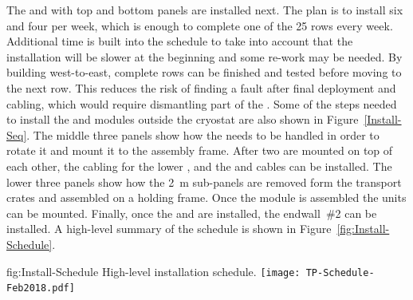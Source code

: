 The  and  with top and bottom  panels are
installed next. The plan is to install six  and four
 per week, which is enough to complete one of the \num{25}
rows every week. Additional time is built into the schedule to take
into account that the installation will be slower at the beginning and
some re-work may be needed. By building west-to-east, complete rows can
be finished and tested before moving to the next row. This reduces the
risk of finding a fault after final  deployment and cabling,
which would require dismantling part of the . Some of the steps
needed to install the  and  modules outside the
cryostat are also shown in Figure~\ref{Install-Seq}.  The middle three
panels show how the  needs to be handled in order to rotate
it and mount it to the assembly frame. After two  are
mounted on top of each other, the cabling for the lower , and the
 and  cables can be installed. The
lower three panels show how the \SI{2}{m}  sub-panels are
removed form the transport crates and assembled on a holding frame. Once
the  module is assembled the  units can be
mounted. Finally, once the  and  are installed,
the endwall~\#2 can be installed. A high-level summary of the schedule
is shown in Figure~\ref{fig:Install-Schedule}.

\begin{dunefigure}{fig:Install-Schedule}
  {High-level installation schedule.}
 \texttt{[image: TP-Schedule-Feb2018.pdf]}
\end{dunefigure}


